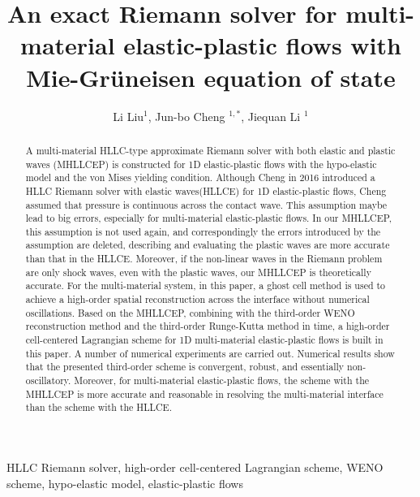 \documentclass[review]{elsarticle}
\begin{document}
\title{An exact Riemann solver for  multi-material   elastic-plastic flows with Mie-Gr\"uneisen equation of state}
\author{Li Liu$^1$, Jun-bo Cheng $^{1,*}$, Jiequan Li $^{1}$}

\maketitle

\address{$^1$  Institute of Applied Physics and Computational Mathematics, Beijing 100094, China }

\begin{abstract}
  A multi-material HLLC-type  approximate Riemann solver with both elastic and plastic waves (MHLLCEP) is constructed for 1D elastic-plastic flows with the  hypo-elastic model and the von Mises yielding condition. Although Cheng in 2016 introduced a HLLC Riemann solver with elastic waves(HLLCE) for 1D elastic-plastic flows, Cheng assumed that pressure is continuous across the contact wave. This assumption maybe lead to big errors, especially for multi-material elastic-plastic flows. In our MHLLCEP, this assumption is not used again, and correspondingly the errors introduced by the assumption are deleted, describing and evaluating the plastic waves are more accurate than that in the HLLCE. Moreover, if the non-linear waves in the Riemann problem are only shock waves, even with the plastic waves, our MHLLCEP is theoretically accurate. For  the multi-material system, in this paper, a ghost cell method is used to achieve a high-order spatial reconstruction across the interface without numerical oscillations. Based on the MHLLCEP, combining with the third-order WENO reconstruction method and the third-order Runge-Kutta method in time, a high-order cell-centered Lagrangian scheme for 1D multi-material elastic-plastic flows is built in this paper. A number of numerical experiments are carried out. Numerical results show  that the presented third-order scheme is convergent, robust, and essentially non-oscillatory. Moreover, for multi-material elastic-plastic flows, the scheme with  the MHLLCEP is more accurate and reasonable in resolving the multi-material interface than the scheme with the  HLLCE.
\end{abstract}

\begin{keyword}
  HLLC Riemann solver, high-order cell-centered Lagrangian scheme,  WENO scheme,  hypo-elastic model, elastic-plastic flows
\end{keyword}
\end{document}
